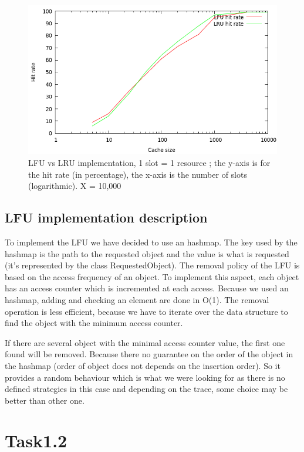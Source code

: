 \begin{figure}[!ht]
    \centering
    \includegraphics[width=\linewidth]{task1.png}
    \caption{LFU vs LRU implementation, 1 slot = 1 resource ; the y-axis is
    for the hit rate (in percentage), the x-axis is the number of slots
    (logarithmic). X = 10,000}
\end{figure}
\FloatBarrier

\subsection{LFU implementation description}
To implement the LFU we have decided to use an hashmap. The key used 
by the hashmap is the path to the requested object and the value is what
is requested (it's represented by the class RequestedObject). The removal
policy of the LFU is based on the access frequency of an object. To
implement this aspect, each object has an access counter which is 
incremented at each access. Because we used an hashmap, adding and
checking an element are done in O(1). The removal operation is less efficient,
because we have to iterate over the data structure to find the object with
the minimum access counter. \newline

If there are several object with the minimal access counter value, the first
one found will be removed. Because there no guarantee on the order of
the object in the hashmap (order of object does not depends on the 
insertion order). So it provides a random behaviour which is what we
were looking for as there is no defined strategies in this case and 
depending on the trace, some choice may be better than other one. 

\section{Task1.2}

